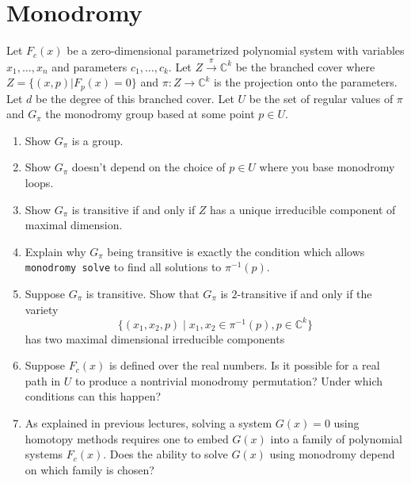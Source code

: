 \documentclass[11pt,reqno]{amsart}
\theoremstyle{definition}
\theoremstyle{remark}
\numberwithin{equation}{section}
\newcommand{\C}{\mathbb{C}}
\begin{document}
\section{Monodromy}
Let $F_c(x)$ be a zero-dimensional parametrized polynomial system with variables $x_1,\ldots,x_n$ and parameters $c_1,\ldots,c_k$. Let $Z \xrightarrow{\pi} \C^k$ be the branched cover where $Z=\{(x,p) | F_p(x)=0\}$ and $\pi:Z \to \C^k$ is the projection onto the parameters. Let $d$ be the degree of this branched cover.
Let $U$ be the set of regular values of $\pi$ and $G_\pi$ the monodromy group based at some point $p \in U$. 

\begin{enumerate}
\item Show $G_\pi$ is a group.

\item Show $G_\pi$ doesn't depend on the choice of $p \in U$ where you base monodromy loops. 


\item Show $G_\pi$ is transitive if and only if $Z$ has a unique irreducible component of maximal dimension.

\item Explain why $G_\pi$ being transitive is exactly the condition which allows \texttt{monodromy solve} to find all solutions to $\pi^{-1}(p)$.

\item Suppose $G_\pi$ is transitive. Show that $G_\pi$ is $2$-transitive if and only if the variety 
$$\{(x_1,x_2,p) \mid x_1,x_2 \in \pi^{-1}(p), p \in \C^k \}$$
has two maximal dimensional irreducible components 

\item Suppose $F_c(x)$ is defined over the real numbers.
 Is it possible for a real path in $U$ to produce a nontrivial monodromy permutation? Under which conditions can this happen?
 
\item As explained in previous lectures, solving a system $G(x)=0$ using homotopy methods requires one to embed $G(x)$ into a family of polynomial systems $F_c(x)$. Does the ability to solve $G(x)$ using monodromy depend on which family is chosen? 


\end{enumerate}
\end{document}
